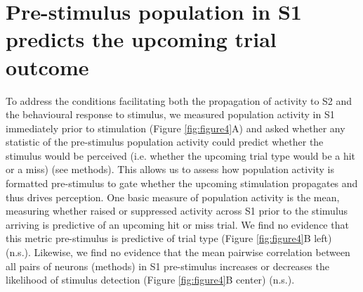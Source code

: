 \section{Pre-stimulus population in S1 predicts the upcoming trial outcome}

To address the conditions facilitating both the propagation of activity to S2 and the behavioural response to stimulus, we measured population activity in S1 immediately prior to stimulation (Figure \ref{fig:figure4}A) and asked whether any statistic of the pre-stimulus population activity could predict whether the stimulus would be perceived (i.e. whether the upcoming trial type would be a hit or a miss) (see methods). This allows us to assess how population activity is formatted pre-stimulus to gate whether the upcoming stimulation propagates and thus drives perception. One basic measure of population activity is the mean, measuring whether raised or suppressed activity across S1 prior to the stimulus arriving is predictive of an upcoming hit or miss trial. We find no evidence that this metric pre-stimulus is predictive of trial type (Figure \ref{fig:figure4}B left) (n.s.). Likewise, we find no evidence that the mean pairwise correlation between all pairs of neurons (methods) in S1 pre-stimulus increases or decreases the likelihood of stimulus detection (Figure \ref{fig:figure4}B center) (n.s.).


